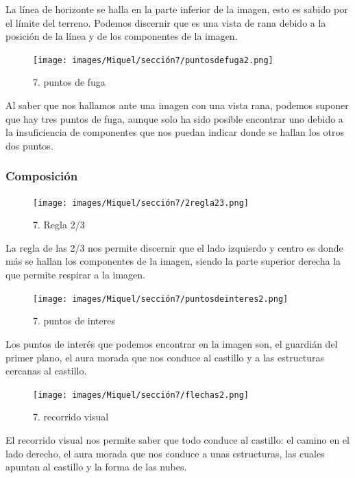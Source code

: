 \documentclass[12pt]{article}
\begin{document}
    La línea de horizonte se halla en la parte inferior de la imagen, esto es sabido por el límite del terreno. Podemos discernir que es una vista de rana debido a la posición de la línea y de los componentes de la imagen.
    
    \begin{figure}[H]
      \centering
      \texttt{[image: images/Miquel/sección7/puntosdefuga2.png]}
      \caption{\small 7. puntos de fuga}
    \end{figure}

    Al saber que nos hallamos ante una imagen con una vista rana, podemos suponer que hay tres puntos de fuga, aunque solo ha sido posible encontrar uno debido a la insuficiencia de componentes que nos puedan indicar donde se hallan los otros dos puntos.

        \subsubsection{Composición}
    \begin{figure}[H]
      \centering
      \texttt{[image: images/Miquel/sección7/2regla23.png]}
      \caption{\small 7. Regla 2/3}
    \end{figure}
    
    La regla de las 2/3 nos permite discernir que el lado izquierdo y centro es donde más se hallan los componentes de la imagen, siendo la parte superior derecha la que permite respirar a la imagen.

    \begin{figure}[H]
      \centering
      \texttt{[image: images/Miquel/sección7/puntosdeinteres2.png]}
      \caption{\small 7. puntos de interes}
    \end{figure}

    Los puntos de interés que podemos encontrar en la imagen son, el guardián del primer plano, el aura morada que nos conduce al castillo y a las estructuras cercanas al castillo.

    \begin{figure}[H]
      \centering
      \texttt{[image: images/Miquel/sección7/flechas2.png]}
      \caption{\small 7. recorrido visual}
    \end{figure}

    El recorrido visual nos permite saber que todo conduce al castillo: el camino en el lado derecho, el aura morada  que nos conduce a unas estructuras, las cuales apuntan al castillo y la forma de las nubes.
\end{document}
